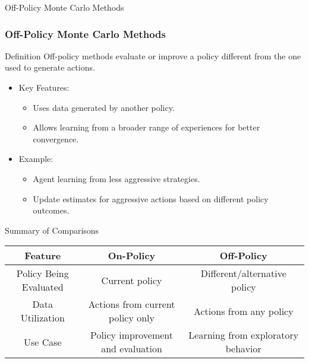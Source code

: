 \documentclass[aspectratio=169]{beamer}
\begin{document}
\begin{frame}{Off-Policy Monte Carlo Methods}
    \frametitle{Off-Policy Monte Carlo Methods}
    
    \begin{block}{Definition}
        Off-policy methods evaluate or improve a policy different from the one used to generate actions.
    \end{block}

    \begin{itemize}
        \item Key Features:
        \begin{itemize}
            \item Uses data generated by another policy.
            \item Allows learning from a broader range of experiences for better convergence.
        \end{itemize}
        
        \item Example:
        \begin{itemize}
            \item Agent learning from less aggressive strategies.
            \item Update estimates for aggressive actions based on different policy outcomes.
        \end{itemize}
    \end{itemize}
\end{frame}

\begin{frame}{Summary of Comparisons}
    \begin{table}[ht]
        \centering
        \begin{tabular}{|c|c|c|}
            \hline
            Feature & On-Policy & Off-Policy \\
            \hline
            Policy Being Evaluated & Current policy & Different/alternative policy \\
            \hline
            Data Utilization & Actions from current policy only & Actions from any policy \\
            \hline
            Use Case & Policy improvement and evaluation & Learning from exploratory behavior \\
            \hline
        \end{tabular}
    \end{table}
\end{frame}
\end{document}
